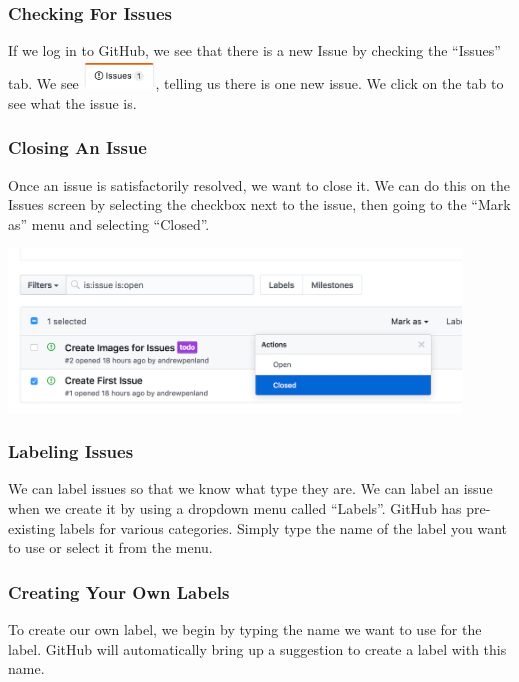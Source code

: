 \documentclass[11pt]{article}
\begin{document}
\subsubsection{Checking For Issues}

If we log in to GitHub, we see that there is a new Issue by checking the ``Issues'' tab. We see \includegraphics[width=0.75in]{IssuesLink}, telling us there is one new issue. We click on the tab to see what the issue is.

\subsubsection{Closing An Issue} 

Once an issue is satisfactorily resolved, we want to close it. We can do this on the Issues screen by selecting the checkbox next to the issue, then going to the ``Mark as'' menu and selecting ``Closed''.

\begin{center}
\includegraphics[width=0.9\textwidth]{MarkIssueClosed}
\end{center}

\subsubsection{Labeling Issues}

We can label issues so that we know what type they are. We can label an issue when we create it by using a dropdown menu called ``Labels''. GitHub has pre-existing labels for various categories. Simply type the name of the label you want to use or select it from the menu. 

\subsubsection{Creating Your Own Labels}

To create our own label, we begin by typing the name we want to use for the label. GitHub will automatically bring up a suggestion to create a label with this name.
\end{document}
